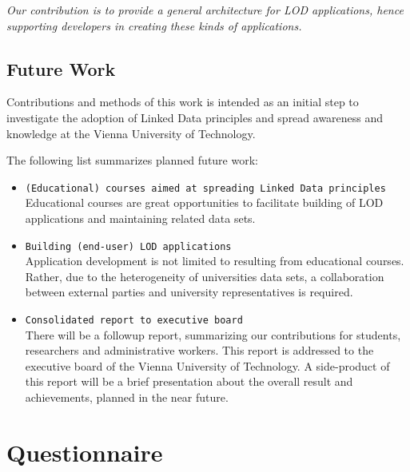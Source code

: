 \documentclass{article}
\begin{document}
\textit{Our contribution is to provide a general architecture for LOD applications, hence supporting developers in creating these kinds of applications.}

\subsection{Future Work}
\label{sec:future_work}
Contributions and methods of this work is intended as an initial step to investigate the adoption of Linked Data principles and spread awareness and knowledge at the Vienna University of Technology. 

The following list summarizes planned future work:
\begin{itemize}
	\item \texttt{(Educational) courses aimed at spreading Linked Data principles}~\\
	Educational courses are great opportunities to facilitate building of LOD applications and maintaining related data sets. 
	\item \texttt{Building (end-user) LOD applications}~\\
	Application development is not limited to resulting from educational courses. Rather, due to the heterogeneity of universities data sets, a collaboration between external parties and university representatives is required.  
	\item \texttt{Consolidated report to executive board}~\\
	There will be a followup report, summarizing our contributions for students, researchers and administrative workers. This report is addressed to the executive board of the Vienna University of Technology. A side-product of this report will be a brief presentation about the overall result and achievements, planned in the near future. 
\end{itemize}
\newpage
{}



\newpage
\appendix

\section{Questionnaire}

\end{document}
